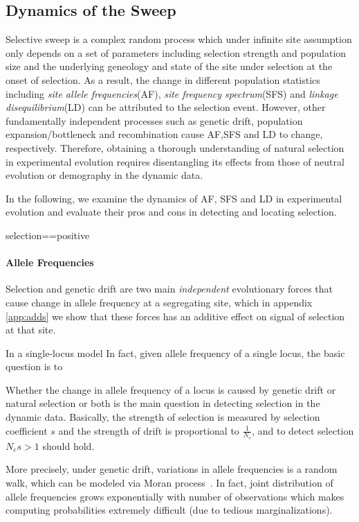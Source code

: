 \documentclass[11pt]{article}
\begin{document}
\subsection{Dynamics of the Sweep}
Selective sweep is a complex random process which under infinite site assumption
only depends on a set of parameters including selection strength and 
population size and the underlying geneology and state of the site under 
selection at the onset of selection. 
As a result, the change in different population statistics including \emph{site 
allele frequencies}(AF), \emph{site frequency spectrum}(SFS) and \emph{linkage 
disequilibrium}(LD) can be attributed to the selection event.
However, other fundamentally independent processes such as genetic drift, 
population expansion/bottleneck and recombination cause AF,SFS and LD to 
change, respectively. Therefore, obtaining a thorough understanding of natural 
selection in experimental evolution requires disentangling its effects from 
those of neutral evolution or demography in the dynamic data.



 In the following, we examine the dynamics of AF, SFS and LD in experimental 
 evolution and evaluate their pros and cons in detecting and locating selection.

selection==positive

\paragraph{Allele Frequencies}
Selection and genetic drift are two main \emph{independent} evolutionary forces 
that cause change in allele frequency at a segregating site, which in  appendix
 \ref{app:adds} we show that these forces has an additive effect on signal of 
 selection at that site. 
 
 In a single-locus model
In fact, given allele frequency of a single locus, the basic question is to

 Whether the change in allele frequency of a locus is caused by genetic drift 
 or natural
  selection or both is the main question in detecting selection in the dynamic
   data. Basically, the strength of selection is measured by selection 
   coefficient $s$ and the strength of drift is proportional to 
   $\frac{1}{N_e}$, and to detect selection $N_es>1$ should hold.
  

More precisely, under genetic drift, variations in allele frequencies is a 
random walk, which can be modeled via Moran process~\cite{moran1962statistical}.
In fact, joint distribution of allele frequencies grows exponentially with 
number of observations which makes computing probabilities extremely difficult 
(due to tedious marginalizations).
\end{document}
